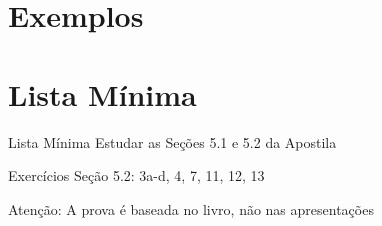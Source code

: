 \documentclass[fleqn,utf8,aspectratio=169,12pt]{beamer}
\begin{document}
\section{Exemplos}





\section{Lista Mínima}

\begin{frame}{Lista Mínima}
  Estudar as Seções 5.1 e 5.2 da Apostila

  \vfill
  Exercícios Seção 5.2: 3a-d, 4, 7, 11, 12, 13

  \vfill
  Atenção: A prova é baseada no livro, não nas apresentações
\end{frame}

\end{document}
